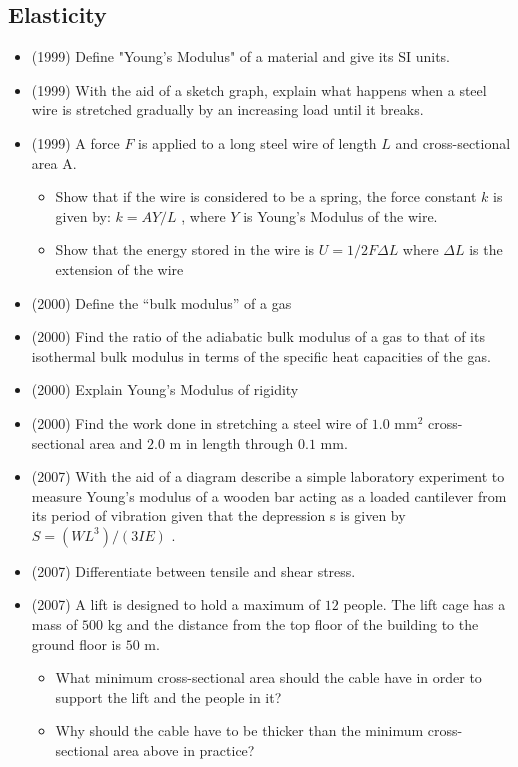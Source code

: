 \documentclass{article}
\begin{document}
\subsection{Elasticity}
\begin{itemize}
\item (1999)  Define "Young's Modulus" of a material and give its SI units.
\item (1999)  With the aid of a sketch graph, explain what happens when a steel wire is stretched gradually by an increasing load until it breaks. 
\item (1999)  A force $ F$ is applied to a long steel wire of length $ L$ and cross-sectional area A.\begin{itemize}
\item Show that if the wire is considered to be a spring, the force constant $ k$ is given by: $ k= AY/L$ , where $ Y$ is Young's Modulus of the wire.
\item Show that the energy stored in the wire is $ U=1/2F \Delta L$ where $ \Delta{L}$ is the extension of the wire
\end{itemize}
\item (2000)  Define the “bulk modulus” of a gas
\item (2000)  Find the ratio of the adiabatic bulk modulus of a gas to that of its isothermal bulk modulus in terms of the specific heat capacities of the gas.
\item (2000)  Explain Young’s Modulus of rigidity
\item (2000)  Find the work done in stretching a steel wire of $ 1.0$ mm$ ^{2}$ cross-sectional area and $ 2.0$ m in length through $ 0.1$ mm.
\item (2007)  With the aid of a diagram describe a simple laboratory experiment to measure Young’s modulus of a wooden bar acting as a loaded cantilever from its period of vibration given that the depression s is given by $ S=(WL^{3})/(3IE)$ . 
\item (2007)  Differentiate between tensile and shear stress. 
\item (2007)  A lift is designed to hold a maximum of $ 12$ people. The lift cage has a mass of $ 500$ kg and the distance from the top floor of the building to the ground floor is $ 50$ m.\begin{itemize}
\item What minimum cross-sectional area should the cable have in order to support the lift and the people in it?
\item Why should the cable have to be thicker than the minimum cross-sectional area above in practice? 

\end{itemize}
\end{itemize}
\end{document}
